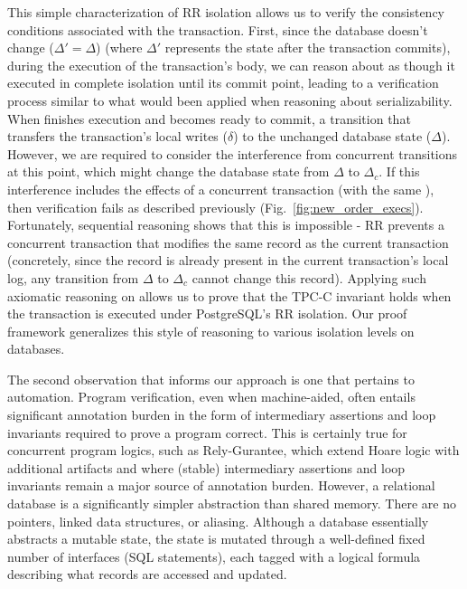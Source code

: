 This simple characterization of RR isolation allows us to verify the
consistency conditions associated with the 
transaction. First, since the database doesn't change ($\Delta' =
\Delta$) (where $\Delta'$ represents the state after the transaction
commits), during the execution of the transaction's body, we can
reason about  as though it executed in complete isolation
until its commit point, leading to a verification process similar to
what would been applied when reasoning about serializability.  When
 finishes execution and becomes ready to commit, a
transition that transfers the transaction's local writes ($\delta$) to
the unchanged database state ($\Delta$).  However, we are required to
consider the interference from concurrent transitions at this point,
which might change the database state from $\Delta$ to $\Delta_c$. If
this interference includes the effects of a concurrent 
transaction (with the same ), then verification fails as
described previously (Fig.~\ref{fig:new_order_execs}). Fortunately,
sequential reasoning shows that this is impossible - RR prevents a
concurrent  transaction that modifies the same
 record as the current transaction (concretely, since the
record is already present in the current transaction's local log, any
transition from $\Delta$ to $\Delta_c$ cannot change this record).
Applying such axiomatic reasoning on  allows us to prove
that the TPC-C invariant holds when the transaction is executed under
PostgreSQL's RR isolation.  Our proof framework generalizes this style
of reasoning to various isolation levels on databases.

The second observation that informs our approach is one that pertains
to automation. Program verification, even when machine-aided, often
entails significant annotation burden in the form of intermediary
assertions and loop invariants required to prove a program correct.
This is certainly true for concurrent program logics, such as
Rely-Gurantee, which extend Hoare logic with additional artifacts and
where (stable) intermediary assertions and loop invariants remain a
major source of annotation burden.  However, a relational database is
a significantly simpler abstraction than shared memory. There are no
pointers, linked data structures, or aliasing.  Although a database
essentially abstracts a mutable state, the state is mutated through a
well-defined fixed number of interfaces (SQL statements), each tagged
with a logical formula describing what records are accessed and
updated.


